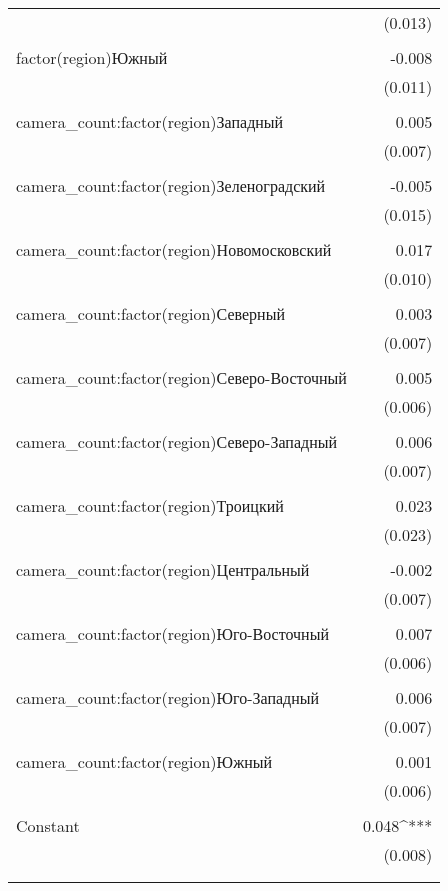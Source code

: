 \begin{table}[!htbp]
\begin{tabular}{@{\extracolsep{5pt}}lD{.}{.}{-3} }
& (0.013) \\ 
& \\ 
factor(region)Южный & -0.008 \\ 
& (0.011) \\ 
& \\ 
camera\_count:factor(region)Западный & 0.005 \\ 
& (0.007) \\ 
& \\ 
camera\_count:factor(region)Зеленоградский & -0.005 \\ 
& (0.015) \\ 
& \\ 
camera\_count:factor(region)Новомосковский & 0.017 \\ 
& (0.010) \\ 
& \\ 
camera\_count:factor(region)Северный & 0.003 \\ 
& (0.007) \\ 
& \\ 
camera\_count:factor(region)Северо-Восточный & 0.005 \\ 
& (0.006) \\ 
& \\ 
camera\_count:factor(region)Северо-Западный & 0.006 \\ 
& (0.007) \\ 
& \\ 
camera\_count:factor(region)Троицкий & 0.023 \\ 
& (0.023) \\ 
& \\ 
camera\_count:factor(region)Центральный & -0.002 \\ 
& (0.007) \\ 
& \\ 
camera\_count:factor(region)Юго-Восточный & 0.007 \\ 
& (0.006) \\ 
& \\ 
camera\_count:factor(region)Юго-Западный & 0.006 \\ 
& (0.007) \\ 
& \\ 
camera\_count:factor(region)Южный & 0.001 \\ 
& (0.006) \\ 
& \\ 
Constant & 0.048^{***} \\ 
& (0.008) \\ 
& \\ 
\hline \\[-1.8ex] 

\end{tabular}
\end{table}
